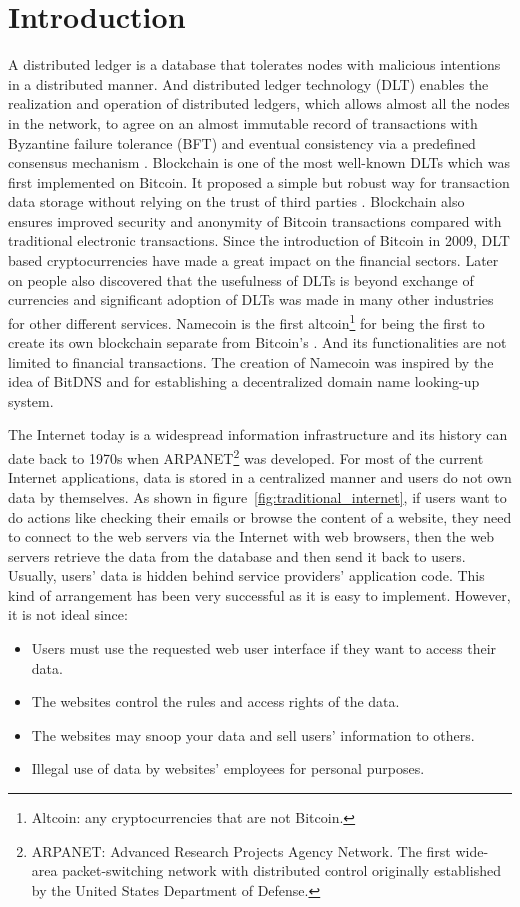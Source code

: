 \section{Introduction}
\label{sec:introduction}

A distributed ledger is a database that tolerates nodes with malicious intentions in a distributed manner.
And distributed ledger technology (DLT) enables the realization and operation of distributed ledgers,
which allows almost all the nodes in the network, to agree on an almost immutable record of transactions with Byzantine failure tolerance (BFT) and eventual consistency via a predefined consensus mechanism \cite{Sunyaev2020}.
Blockchain is one of the most well-known DLTs which was first implemented on Bitcoin. It proposed a simple but robust way for transaction data storage without relying on the trust of third parties \cite{nakamoto2008peer}.
Blockchain also ensures improved security and anonymity of Bitcoin transactions compared with traditional electronic transactions.
Since the introduction of Bitcoin in 2009, DLT based cryptocurrencies have made a great impact on the financial sectors. Later on people also discovered that the usefulness of DLTs is beyond exchange of currencies and
significant adoption of DLTs was made in many other industries for other different services.
Namecoin is the first altcoin\footnote{Altcoin: any cryptocurrencies that are not Bitcoin.} for being the first to create its own blockchain separate from Bitcoin's \cite{kalodner2015empirical}.
And its functionalities are not limited to financial transactions.
The creation of Namecoin was inspired by the idea of BitDNS \cite{merited2010bitdns} and for establishing a decentralized domain name looking-up system.


The Internet today is a widespread information infrastructure and its history can date back to 1970s when ARPANET\footnote{ARPANET: Advanced Research Projects Agency Network.
    The first wide-area packet-switching network with distributed control originally established by the United States Department of Defense.} was developed.
For most of the current Internet applications, data is stored in a centralized manner and users do not own data by themselves. As shown in figure~\ref{fig:traditional_internet},
if users want to do actions like checking their emails or browse the content of a website, they need to connect to the web servers via the Internet with web browsers, then the web servers retrieve the data from the database and then send it back to users.
Usually, users' data is hidden behind service providers' application code. This kind of arrangement has been very successful as it is easy to implement. However, it is not ideal since:
\begin{itemize}
    \item Users must use the requested web user interface if they want to access their data.
    \item The websites control the rules and access rights of the data.
    \item The websites may snoop your data and sell users' information to others.
    \item Illegal use of data by websites' employees for personal purposes.
\end{itemize}

